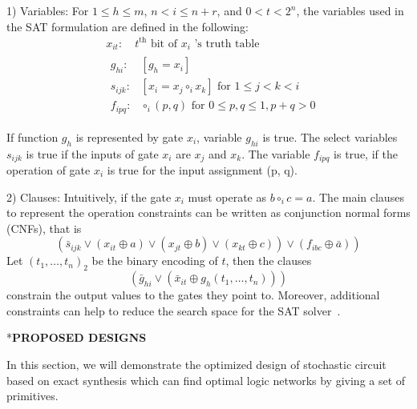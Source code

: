 \documentclass[conference,letterpaper]{IEEEtran}
\makeatletter
\renewcommand{\section}{\@startsection{section}{1}{0mm}
    {-\baselineskip}{0.001\baselineskip}{\bf\leftline}}
\makeatother
\begin{document}
1) Variables: For $1 \leq h \leq m$, $n<i \leq n+r$, and $0<t<2^{n}$, the variables used in the SAT formulation are defined in the following:
\begin{equation}
\begin{aligned}
&x_{i t}: \quad t^{\mathrm{th}} \text { bit of } x_{i} \text { 's truth table }\\
&\begin{aligned}
g_{h i}: &\left[g_{h}=x_{i}\right] \\
s_{i j k}: &\left[x_{i}=x_{j} \circ_{i} x_{k}\right] \text { for } 1 \leq j<k<i \\
f_{i p q}: & \circ_{i}(p, q) \text { for } 0 \leq p, q \leq 1, p+q>0
\end{aligned}
\end{aligned}
\end{equation}

If function $g_{h}$ is represented by gate $x_{i}$, variable $g_{h i}$ is true. The select variables $s_{i j k}$ is true if the inputs of gate $x_{i}$ are $x_{j}$ and $x_{k}$. The variable $f_{i p q}$ is true, if the operation of gate $x_{i}$ is true for the input assignment (p, q).

2) Clauses: Intuitively, if the gate $x_{i}$ must operate as $b \circ_{i} c=a$.  The main clauses to represent the operation constraints can be written as conjunction normal forms (CNFs), that is
\begin{equation}
\left.\left(\bar{s}_{i j k} \vee\left(x_{i t} \oplus a\right) \vee\left(x_{j t} \oplus b\right) \vee\left(x_{k t} \oplus c\right)\right) \vee\left(f_{i b c} \oplus \bar{a}\right)\right)
\end{equation}
Let $\left(t_{1}, \ldots, t_{n}\right)_{2}$ be the binary encoding of $t$, then the clauses
\begin{equation}
\left(\bar{g}_{h i} \vee\left(\bar{x}_{i t} \oplus g_{h}\left(t_{1}, \ldots, t_{n}\right)\right)\right)
\end{equation}
constrain the output values to the gates they point to. Moreover, additional constraints can help to reduce the search space for the SAT solver~\cite{4}.

\section*{\textbf{\large PROPOSED DESIGNS}}

In this section, we will demonstrate the optimized design of stochastic circuit based on exact synthesis which can find optimal logic networks by giving a set of primitives.
\end{document}
